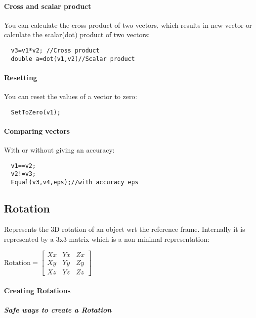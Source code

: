 \documentclass[a4paper,10pt]{report}
\begin{document}
\paragraph{Cross and scalar product}
\label{sec:cross-scalar-product}
You can calculate the cross product of two vectors, which results in
new vector or calculate the scalar(dot) product of two vectors:
\begin{lstlisting}
  v3=v1*v2; //Cross product
  double a=dot(v1,v2)//Scalar product
\end{lstlisting}

\paragraph{Resetting}
\label{sec:resetting}
You can reset the values of a vector to zero:
\begin{lstlisting}
  SetToZero(v1);
\end{lstlisting}

\paragraph{Comparing vectors}
\label{sec:comparing-vectors}
With or without giving an accuracy:
\begin{lstlisting}
  v1==v2;
  v2!=v3;
  Equal(v3,v4,eps);//with accuracy eps
\end{lstlisting}

\subsection{Rotation}
\label{sec:rotation}

Represents the 3D rotation of an object wrt the reference
frame. Internally it is represented by a 3x3 matrix which is a
non-minimal representation:

$\mathrm{Rotation} =
\left[\begin{array}{ccc} 
    Xx&Yx&Zx\\
    Xy&Yy&Zy\\
    Xz&Yz&Zz
  \end{array}\right]
$

\paragraph{Creating Rotations}
\label{sec:creating-rotations}

\subparagraph{Safe ways to create a Rotation}
\label{sec:safe-ways-create}
\end{document}
